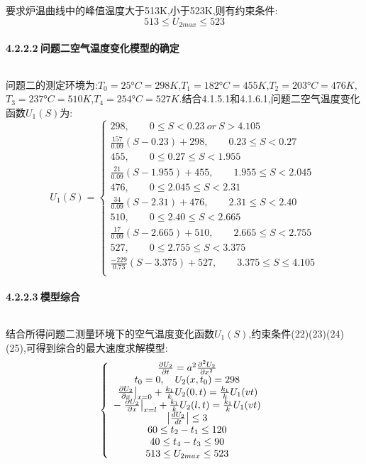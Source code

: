 \documentclass[12pt]{ctexart}
\numberwithin{figure}{section}
\numberwithin{table}{section}
\begin{document}
要求炉温曲线中的峰值温度大于513K,小于523K,则有约束条件:
\begin{equation}
513\leq U_{2max}\leq523
\end{equation}

\paragraph{4.2.2.2$\ $问题二空气温度变化模型的确定}$\ $

问题二的测定环境为:$T_0=25°C=298K$,$T_1=182°C=455K$,$T_2=203°C=476K$,$T_3=237°C=510K$,$T_4=254°C=527K$.结合4.1.5.1和4.1.6.1,问题二空气温度变化函数$U_1(S)$为:
\begin{equation}
U_1(S)=\left\{
\begin{array}{cc}
298,\quad\quad 0\leq S<0.23\ or\ S>4.105\\
\frac{157}{0.09}(S-0.23)+298,\quad\quad0.23\leq S<0.27\\
455,\quad\quad 0\leq 0.27\leq S<1.955\\
\frac{21}{0.09}(S-1.955)+455,\quad\quad1.955\leq S<2.045\\
476,\quad\quad 0\leq 2.045\leq S<2.31\\
\frac{34}{0.09}(S-2.31)+476,\quad\quad2.31\leq S<2.40\\
510,\quad\quad0\leq 2.40\leq S<2.665\\
\frac{17}{0.09}(S-2.665)+510,\quad\quad2.665\leq S<2.755\\
527,\quad\quad0\leq 2.755\leq S<3.375\\
\frac{-229}{0.73}(S-3.375)+527,\quad\quad3.375\leq S\leq4.105\\
\end{array}\right. 
\end{equation}

\paragraph{4.2.2.3$\ $模型综合}$\ $

结合所得问题二测量环境下的空气温度变化函数$U_1(S)$,约束条件(22)(23)(24)(25),可得到综合的最大速度求解模型:
\begin{equation}
\left\{
\begin{array}{cc}
  \frac{\partial U_2}{\partial t}=a^2\frac{\partial^2 U_2}{\partial x^2}\\
  t_0=0,\quad  U_2(x,t_0)=298\\
  \left.\frac{\partial U_2}{\partial x}\right|_{x=0}+\frac{k_1}{k}U_2(0,t)=\frac{k_1}{k}U_1(vt)\\
  -\left.\frac{\partial U_2}{\partial x}\right|_{x=l}+\frac{k_1}{k}U_2(l,t)=\frac{k_1}{k}U_1(vt)\\
\left|\frac{d U_2}{d t}\right|\leq3\\
60\leq t_2-t_1\leq120\\
40\leq t_4-t_3\leq90\\
513\leq U_{2max}\leq523
\end{array}\right. \\
\end{equation}
\end{document}
